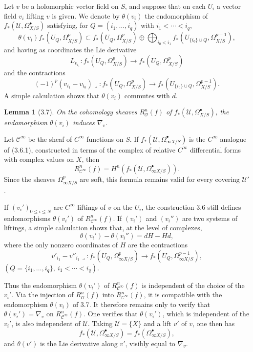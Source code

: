 \documentclass[10pt]{article}
\newcommand{\cO}{\mathcal O}
\newcommand{\cU}{\mathcal U}
\newcommand{\cC}{\mathcal C}
\theoremstyle{deligne}
\newtheorem*{lemma}{Lemma}
\begin{document}
Let $v$ be a holomorphic vector field on $S$, and suppose that on each $U_i$ a vector field $v_i$ lifting $v$ is given. We denote by $\theta(v_i)$ the endomorphism of $f_*(\cU,\Omega^\bullet_{X/S})$ satisfying, for $Q=(i_1,\ldots,i_q)$ with $i_1<\cdots<i_q$,
\[
\theta(v_i) f_*(U_Q,\Omega^p_{X/S})
\subset
f_*(U_Q,\Omega^p_{X/S})
\oplus
\bigoplus_{i_0<i_1} f_*(U_{\{i_0\}\cup Q},\Omega^{p-1}_{X/S}),
\]
and having as coordinates the Lie derivative
\[
L_{v_{i_1}}:f_*(U_Q,\Omega^p_{X/S})\longrightarrow f_*(U_Q,\Omega^p_{X/S})
\]
and the contractions
\[
(-1)^p(v_{i_1}-v_{i_0})\lrcorner:
 f_*(U_Q,\Omega^p_{X/S})\longrightarrow f_*(U_{\{i_0\}\cup Q},\Omega^{p-1}_{X/S}).
\]
A simple calculation shows that $\theta(v_i)$ commutes with $d$.

\begin{lemma}[3.7]
On the cohomology sheaves $R_\cO^n(f)$ of $f_*(\cU,\Omega^\bullet_{X/S})$, the endomorphism $\theta(v_i)$ induces $\nabla_v$.
\end{lemma}

Let $\cC^\infty$ be the sheaf of $C^\infty$ functions on $S$. If $f_*(\cU,\Omega^\bullet_{\infty X/S})$ is the $C^\infty$ analogue of (3.6.1), constructed in terms of the complex of relative $C^\infty$ differential forms with complex values on $X$, then
\[
R_{\cC^\infty}^n(f)=H^n(f_*(\cU,\Omega^\bullet_{\infty X/S})).
\]
Since the sheaves $\Omega^p_{\infty X/S}$ are soft, this formula remains valid for every covering $\cU'$.

If $(v_i')_{0\le i\le N}$ are $C^\infty$ liftings of $v$ on the $U_i$, the construction 3.6 still defines endomorphisms $\theta(v_i')$ of $R_{\cC^\infty}^n(f)$. If $(v_i')$ and $(v_i'')$ are two systems of liftings, a simple calculation shows that, at the level of complexes,
\begin{equation}
\theta(v_i')-\theta(v_i'')=dH-Hd,
\tag{3.7.1}
\end{equation}
where the only nonzero coordinates of $H$ are the contractions
\[
v'_{i_1}-v''_{i_1}\lrcorner:
 f_*(U_Q,\Omega^p_{\infty X/S})\longrightarrow f_*(U_Q,\Omega^{p-1}_{\infty X/S}),
\]
$(Q=\{i_1,\ldots,i_q\},\ i_1<\cdots<i_q)$.

Thus the endomorphism $\theta(v_i')$ of $R_{\cC^\infty}^n(f)$ is independent of the choice of the $v_i'$. Via the injection of $R_\cO^n(f)$ into $R_{\cC^\infty}^n(f)$, it is compatible with the endomorphism $\theta(v_i)$ of 3.7. It therefore remains only to verify that $\theta(v_i')=\nabla_v$ on $R_{\cC^\infty}^n(f)$. One verifies that $\theta(v_i')$, which is independent of the $v_i'$, is also independent of $\cU$. Taking $\cU=\{X\}$ and a lift $v'$ of $v$, one then has
\[
f_*(\cU,\Omega^\bullet_{\infty X/S})=f_*(\Omega^\bullet_{\infty X/S}),
\]
and $\theta(v')$ is the Lie derivative along $v'$, visibly equal to $\nabla_v$.
\end{document}
